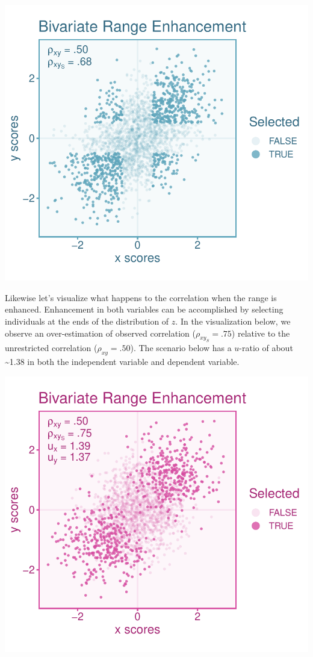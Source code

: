 \documentclass[
  letterpaper,
  DIV=11,
  numbers=noendperiod]{scrreprt}
\begin{document}
\includegraphics{indirect_range_restriction_files/figure-pdf/unnamed-chunk-5-1.pdf}

Likewise let's visualize what happens to the correlation when the range
is enhanced. Enhancement in both variables can be accomplished by
selecting individuals at the ends of the distribution of \(z\). In the
visualization below, we observe an over-estimation of observed
correlation (\(\rho_{xy_S}=.75\)) relative to the unrestricted
correlation (\(\rho_{xy}=.50\)). The scenario below has a \(u\)-ratio of
about \textasciitilde1.38 in both the independent variable and dependent
variable.

\includegraphics{indirect_range_restriction_files/figure-pdf/unnamed-chunk-6-1.pdf}
\end{document}
